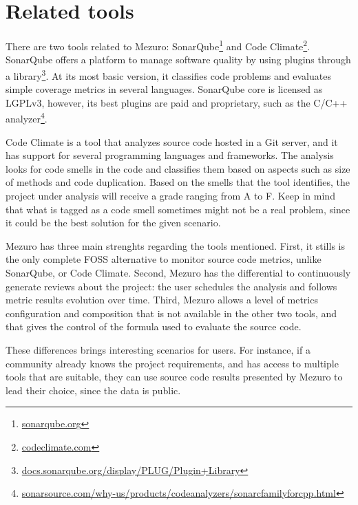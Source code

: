 \section{Related tools}

There are two tools related to Mezuro: SonarQube\footnote{\url{sonarqube.org}}
and Code Climate\footnote{\url{codeclimate.com}}. SonarQube offers a platform
to manage software quality by using plugins through a
library\footnote{\url{docs.sonarqube.org/display/PLUG/Plugin+Library}}.
%
At its most basic version, it classifies code problems and evaluates simple
coverage metrics in several languages. SonarQube core is licensed as LGPLv3,
however, its best plugins are paid and proprietary, such as the C/C++
analyzer\footnote{\url{sonarsource.com/why-us/products/codeanalyzers/sonarcfamilyforcpp.html}}.

Code Climate is a tool that analyzes source code hosted in a Git server, and it
has support for several programming languages and frameworks. The analysis
looks for code smells in the code and classifies them based on aspects such as
size of methods and code duplication. Based on the smells that the tool
identifies, the project under analysis will receive a grade ranging from A to
F. Keep in mind that what is tagged as a code smell sometimes might not be a
real problem, since it could be the best solution for the given scenario.

Mezuro has three main strenghts regarding the tools mentioned. First, it stills
is the only complete FOSS alternative to monitor source code metrics, unlike
SonarQube, or Code Climate. Second, Mezuro has the %
differential to continuously generate reviews about the project: the user
schedules the analysis and follows metric results evolution over time. Third,
Mezuro allows a level of metrics configuration and composition that is not
available in the other two tools, and that gives the control of the formula
used to evaluate the source code.

These differences brings interesting scenarios for users. For instance, if a
community already knows the project requirements, and has access to multiple
tools that are suitable, they can use source code results presented by Mezuro to
lead their choice, since the data is public.

